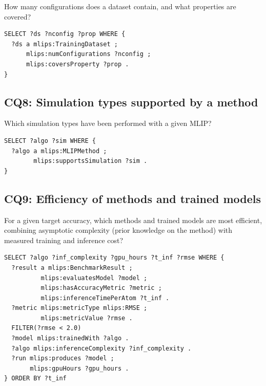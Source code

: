 How many configurations does a dataset contain, and what properties are
covered?
\begin{lstlisting}[language=sparql]
SELECT ?ds ?nconfig ?prop WHERE {
  ?ds a mlips:TrainingDataset ;
      mlips:numConfigurations ?nconfig ;
      mlips:coversProperty ?prop .
}
\end{lstlisting}

\subsection{CQ8: Simulation types supported by a method}

Which simulation types have been performed with a given MLIP?
\begin{lstlisting}[language=sparql]
SELECT ?algo ?sim WHERE {
  ?algo a mlips:MLIPMethod ;
        mlips:supportsSimulation ?sim .
}
\end{lstlisting}

\subsection{CQ9: Efficiency of methods and trained models}

For a given target accuracy, which methods and trained models are
most efficient, combining asymptotic complexity (prior knowledge on the
method) with measured training and inference cost?
\begin{lstlisting}[language=sparql]
SELECT ?algo ?inf_complexity ?gpu_hours ?t_inf ?rmse WHERE {
  ?result a mlips:BenchmarkResult ;
          mlips:evaluatesModel ?model ;
          mlips:hasAccuracyMetric ?metric ;
          mlips:inferenceTimePerAtom ?t_inf .
  ?metric mlips:metricType mlips:RMSE ;
          mlips:metricValue ?rmse .
  FILTER(?rmse < 2.0)
  ?model mlips:trainedWith ?algo .
  ?algo mlips:inferenceComplexity ?inf_complexity .
  ?run mlips:produces ?model ;
       mlips:gpuHours ?gpu_hours .
} ORDER BY ?t_inf
\end{lstlisting}
